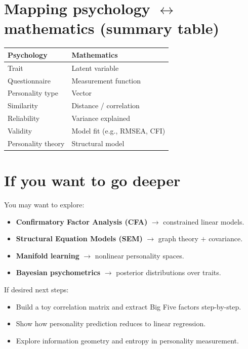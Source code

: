 \documentclass[11pt]{article}
\begin{document}
\section{Mapping psychology $\leftrightarrow$ mathematics (summary table)}
\renewcommand{\arraystretch}{1.2}
\begin{tabularx}{\textwidth}{@{}lX@{}}
\toprule
\textbf{Psychology} & \textbf{Mathematics} \\
\midrule
Trait & Latent variable \\
Questionnaire & Measurement function \\
Personality type & Vector \\
Similarity & Distance / correlation \\
Reliability & Variance explained \\
Validity & Model fit (e.g., RMSEA, CFI) \\
Personality theory & Structural model \\
\bottomrule
\end{tabularx}

\section{If you want to go deeper}
You may want to explore:
\begin{itemize}
  \item \textbf{Confirmatory Factor Analysis (CFA)} $\to$ constrained linear models.
  \item \textbf{Structural Equation Models (SEM)} $\to$ graph theory $+$ covariance.
  \item \textbf{Manifold learning} $\to$ nonlinear personality spaces.
  \item \textbf{Bayesian psychometrics} $\to$ posterior distributions over traits.
\end{itemize}
If desired next steps:
\begin{itemize}
  \item Build a toy correlation matrix and extract Big Five factors step-by-step.
  \item Show how personality prediction reduces to linear regression.
  \item Explore information geometry and entropy in personality measurement.
\end{itemize}
\end{document}
